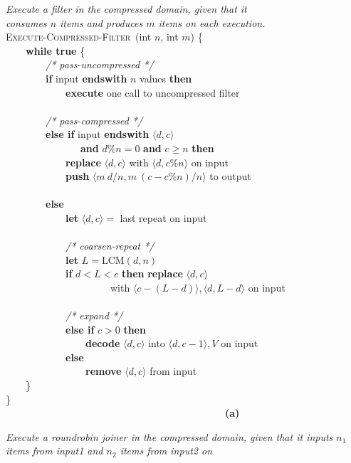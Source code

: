 \newcommand{\mynewline}[0]{\\}
\begin{figure*}[t]
\begin{minipage}{0.48\textwidth}
{\it Execute a filter in the compressed domain, given that it \\consumes
  $n$ items and produces $m$ items on each execution.}\mynewline
\textsc{Execute-Compressed-Filter}~(int $n$, int $m$) \{\mynewline
\mbox{~~~~}{\bf while true} \{\mynewline
\mbox{~~~~}\mbox{~~~~}{\it /* pass-uncompressed */} \mynewline
\mbox{~~~~}\mbox{~~~~}{\bf if} input {\bf endswith} $n$ values {\bf then}\mynewline
\mbox{~~~~}\mbox{~~~~}\mbox{~~~~}{\bf execute} one call to uncompressed filter\mynewline
\mbox{~~~~}\mbox{~~~~}~\mynewline
\mbox{~~~~}\mbox{~~~~}{\it /* pass-compressed */} \mynewline
\mbox{~~~~}\mbox{~~~~}{\bf else if} input {\bf endswith} $\langle d,c \rangle$\mynewline
\mbox{~~~~}\mbox{~~~~}\mbox{~~~~~~~}{\bf and} $d\%n = 0$ {\bf and} $c \geq n$ {\bf then}\mynewline
\mbox{~~~~}\mbox{~~~~}\mbox{~~~~}{\bf replace} $\langle d,c \rangle$ with $\langle d, c\%n\rangle$ on input\mynewline
\mbox{~~~~}\mbox{~~~~}\mbox{~~~~}{\bf push} $\langle m~d/n, m~(c-c\%n)/n \rangle$ to output\mynewline
\mbox{~~~~}\mbox{~~~~}~\mynewline
\mbox{~~~~}\mbox{~~~~}{\bf else}\mynewline
\mbox{~~~~}\mbox{~~~~}\mbox{~~~~}{\bf let} $\langle d,c \rangle = $ last repeat on input\mynewline
\mbox{~~~~}\mbox{~~~~}\mynewline
\mbox{~~~~}\mbox{~~~~}\mbox{~~~~}{\it /* coarsen-repeat */}\mynewline
\mbox{~~~~}\mbox{~~~~}\mbox{~~~~}{\bf let} $L = \mbox{LCM}(d, n)$\mynewline
\mbox{~~~~}\mbox{~~~~}\mbox{~~~~}{\bf if} $d < L < c$ {\bf then} {\bf replace} $\langle d,c \rangle$\mynewline
\mbox{~~~~}\mbox{~~~~}\mbox{~~~~}\mbox{~~~~}\mbox{~~~~~}with $\langle c - (L - d) \rangle, \langle d, L - d\rangle$ on input\mynewline
\mbox{~~~~}\mbox{~~~~}\mynewline
\mbox{~~~~}\mbox{~~~~}\mbox{~~~~}{\it /* expand */}\mynewline
\mbox{~~~~}\mbox{~~~~}\mbox{~~~~}{\bf else if} $c > 0$ {\bf then}\mynewline
\mbox{~~~~}\mbox{~~~~}\mbox{~~~~}\mbox{~~~~}{\bf decode} $\langle d,c \rangle$ into $\langle d,c-1\rangle,V$ on input\mynewline
\mbox{~~~~}\mbox{~~~~}\mbox{~~~~}{\bf else}\mynewline
\mbox{~~~~}\mbox{~~~~}\mbox{~~~~}\mbox{~~~~}{\bf remove} $\langle d,c \rangle$ from input\mynewline
\mbox{~~~~}\}\mynewline
\}\mynewline
\mbox{~}~~~~~~~~~~~~~~~~~~~~~~~~~~~~~~~~~~~~~~~~~~~{\bf (a)}\mynewline
\end{minipage}
\begin{minipage}{0.52\textwidth}
{\it Execute a roundrobin joiner in the compressed domain, given that
  it inputs $n_1$ items from input1 and $n_2$ items from input2 on
}
\end{minipage}
\end{figure*}
